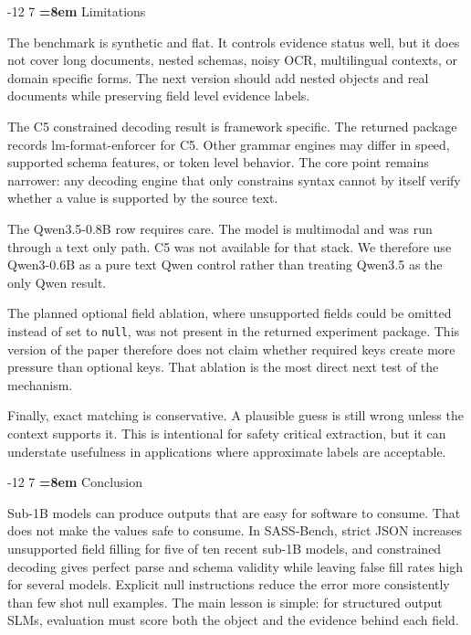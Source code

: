 \documentclass{svproc}
\makeatletter
\newcommand{\sass}{SASS-Bench\xspace}
\newcommand{\cnull}{\texttt{null}\xspace}
\renewcommand\section{\@startsection{section}{1}{\z@}%
   {-12\p@ \@plus -4\p@ \@minus -4\p@}%
   {7\p@ \@plus 4\p@ \@minus 4\p@}%
   {\normalfont\large\bfseries\boldmath
    \rightskip=\z@ \@plus 8em\pretolerance=10000 }}
\makeatother
\begin{document}
\section{Limitations}

The benchmark is synthetic and flat. It controls evidence status well, but it does not cover long documents, nested schemas, noisy OCR, multilingual contexts, or domain specific forms. The next version should add nested objects and real documents while preserving field level evidence labels.

The C5 constrained decoding result is framework specific. The returned package records lm-format-enforcer for C5. Other grammar engines may differ in speed, supported schema features, or token level behavior. The core point remains narrower: any decoding engine that only constrains syntax cannot by itself verify whether a value is supported by the source text.

The Qwen3.5-0.8B row requires care. The model is multimodal and was run through a text only path. C5 was not available for that stack. We therefore use Qwen3-0.6B as a pure text Qwen control rather than treating Qwen3.5 as the only Qwen result.

The planned optional field ablation, where unsupported fields could be omitted instead of set to \cnull, was not present in the returned experiment package. This version of the paper therefore does not claim whether required keys create more pressure than optional keys. That ablation is the most direct next test of the mechanism.

Finally, exact matching is conservative. A plausible guess is still wrong unless the context supports it. This is intentional for safety critical extraction, but it can understate usefulness in applications where approximate labels are acceptable.

\section{Conclusion}

Sub-1B models can produce outputs that are easy for software to consume. That does not make the values safe to consume. In \sass, strict JSON increases unsupported field filling for five of ten recent sub-1B models, and constrained decoding gives perfect parse and schema validity while leaving false fill rates high for several models. Explicit null instructions reduce the error more consistently than few shot null examples. The main lesson is simple: for structured output SLMs, evaluation must score both the object and the evidence behind each field.
\end{document}
